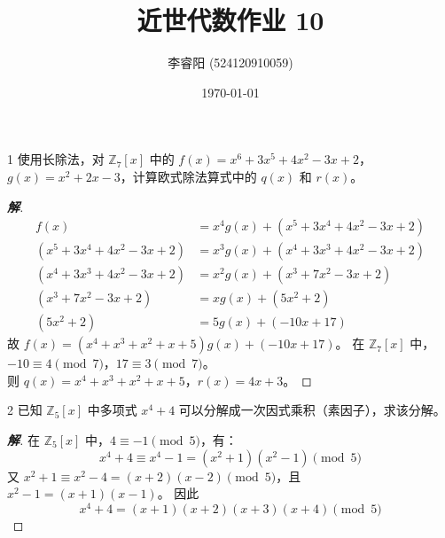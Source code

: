 \documentclass[12pt, a4paper]{article}
\title{近世代数作业 10}
\author{李睿阳 (524120910059)}
\date{\today}
\newenvironment{solution}{
    \begin{proof}[\textbf{解}]
}{
    \end{proof}
}
\begin{document}
\maketitle


\begin{problem}{1}
    使用长除法，对 $\mathbb{Z}_7[x]$ 中的 $f(x)=x^6+3x^5+4x^2-3x+2$，$g(x)=x^2+2x-3$，计算欧式除法算式中的 $q(x)$ 和 $r(x)$。
\end{problem}
\begin{solution}
    \begin{align*}
        f(x) &= x^4 g(x) + (x^5+3x^4+4x^2-3x+2) \\
        (x^5+3x^4+4x^2-3x+2) &= x^3 g(x) + (x^4+3x^3+4x^2-3x+2) \\
        (x^4+3x^3+4x^2-3x+2) &= x^2 g(x) + (x^3+7x^2-3x+2) \\
        (x^3+7x^2-3x+2) &= x g(x) + (5x^2+2) \\
        (5x^2+2) &= 5 g(x) + (-10x+17)
    \end{align*}
    故 $f(x) = (x^4+x^3+x^2+x+5)g(x) + (-10x+17)$。
    在 $\mathbb{Z}_7[x]$ 中，$-10 \equiv 4 \pmod 7$，$17 \equiv 3 \pmod 7$。
    \\
    则 $q(x) = x^4+x^3+x^2+x+5$，$r(x) = 4x+3$。
\end{solution}


\begin{problem}{2}
    已知 $\mathbb{Z}_5[x]$ 中多项式 $x^4+4$ 可以分解成一次因式乘积（素因子），求该分解。
\end{problem}
\begin{solution}
    在 $\mathbb{Z}_5[x]$ 中，$4 \equiv -1 \pmod 5$，有：
    \[ x^4+4 \equiv x^4-1 = (x^2+1)(x^2-1) \pmod 5 \]
    又 $x^2+1 \equiv x^2-4 = (x+2)(x-2) \pmod 5$，且 $x^2-1 = (x+1)(x-1)$。
    因此
    \[ x^4+4 = (x+1)(x+2)(x+3)(x+4) \pmod 5 \]
\end{solution}
\end{document}
